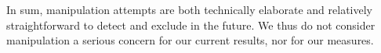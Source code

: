 

In sum, manipulation attempts are both technically elaborate and relatively
straightforward to detect and exclude in the future. %
We thus do not consider manipulation a serious concern for our current
results, nor for our measures.

% 
%